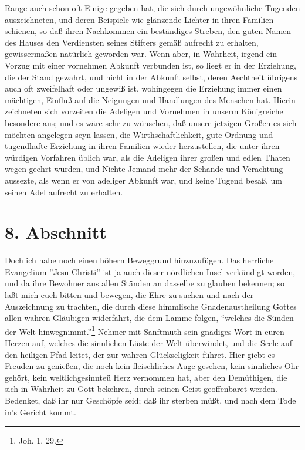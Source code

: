 Range auch schon oft Einige gegeben hat, die sich durch ungewöhnliche Tugenden
auszeichneten, und deren Beispiele wie glänzende Lichter in ihren Familien
schienen, so daß ihren Nachkommen ein beständiges Streben, den guten Namen des
Hauses den Verdiensten seines Stifters gemäß aufrecht zu erhalten, gewissermaßen
natürlich geworden war. Wenn aber, in Wahrheit, irgend ein Vorzug mit einer
vornehmen Abkunft verbunden ist, so liegt er in der Erziehung, die der Stand
gewahrt, und nicht in der Abkunft selbst, deren Aechtheit übrigens auch oft
zweifelhaft oder ungewiß ist, wohingegen die Erziehung immer einen mächtigen,
Einfluß auf die Neigungen und Handlungen des Menschen hat. Hierin zeichneten
sich vorzeiten die Adeligen und Vornehmen in unserm Königreiche besondere aus;
und es wäre sehr zu wünschen, daß unsere jetzigen Großen es sich möchten
angelegen seyn lassen, die Wirthschaftlichkeit, gute Ordnung und tugendhafte
Erziehung in ihren Familien wieder herzustellen, die unter ihren würdigen
Vorfahren üblich war, als die Adeligen ihrer großen und edlen Thaten wegen
geehrt wurden, und Nichte Jemand mehr der Schande und Verachtung aussezte, als
wenn er von adeliger Abkunft war, und keine Tugend besaß, um seinen Adel
aufrecht zu erhalten.

\section{8. Abschnitt} \label{kap11_ab8}

Doch ich habe noch einen höhern Beweggrund hinzuzufügen. Das herrliche
Evangelium ''Jesu Christi'' ist ja auch dieser nördlichen Insel verkündigt
worden, und da ihre Bewohner aus allen Ständen an dasselbe zu glauben bekennen;
so laßt mich euch bitten und bewegen, die Ehre zu suchen und nach der
Auszeichnung zu trachten, die durch diese himmlische Gnadenaustheilung Gottes
allen wahren Gläubigen widerfahrt, die dem Lamme folgen, "`welches die Sünden
der Welt hinwegnimmt."'\footnote{Joh. 1, 29.} Nehmer mit Sanftmuth sein gnädiges
Wort in euren Herzen auf, welches die sinnlichen Lüste der Welt überwindet, und
die Seele auf den heiligen Pfad leitet, der zur wahren Glückseligkeit führet.
Hier giebt es Freuden zu genießen, die noch kein fleischliches Auge gesehen,
kein sinnliches Ohr gehört, kein weltlichgesinnteü Herz vernommen hat, aber den
Demüthigen, die sich in Wahrheit zu Gott bekehren, durch seinen Geist
geoffenbaret werden. Bedenket, daß ihr nur Geschöpfe seid; daß ihr sterben müßt,
und nach dem Tode in’s Gericht kommt.


